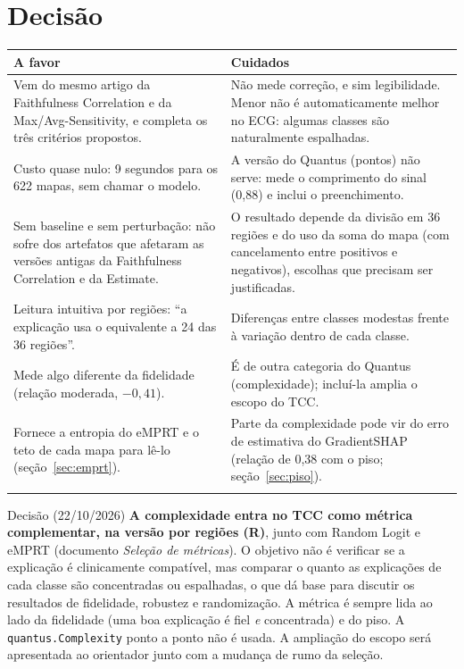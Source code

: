 \documentclass[11pt,a4paper]{article}
\begin{document}
\section{Decisão}\label{sec:decisao}
\begin{center}\small
\begin{tabularx}{\linewidth}{XX}
\toprule
\textbf{A favor} & \textbf{Cuidados} \\
\midrule
Vem do mesmo artigo da Faithfulness Correlation e da Max/Avg-Sensitivity, e completa os três critérios propostos. & Não mede correção, e sim legibilidade. Menor não é automaticamente melhor no ECG: algumas classes são naturalmente espalhadas. \\ \addlinespace
Custo quase nulo: 9 segundos para os 622 mapas, sem chamar o modelo. & A versão do Quantus (pontos) não serve: mede o comprimento do sinal (0,88) e inclui o preenchimento. \\ \addlinespace
Sem baseline e sem perturbação: não sofre dos artefatos que afetaram as versões antigas da Faithfulness Correlation e da Estimate. & O resultado depende da divisão em 36 regiões e do uso da soma do mapa (com cancelamento entre positivos e negativos), escolhas que precisam ser justificadas. \\ \addlinespace
Leitura intuitiva por regiões: “a explicação usa o equivalente a 24 das 36 regiões”. & Diferenças entre classes modestas frente à variação dentro de cada classe. \\ \addlinespace
Mede algo diferente da fidelidade (relação moderada, $-0{,}41$). & É de outra categoria do Quantus (complexidade); incluí-la amplia o escopo do TCC. \\ \addlinespace
Fornece a entropia do eMPRT e o teto de cada mapa para lê-lo (seção~\ref{sec:emprt}). & Parte da complexidade pode vir do erro de estimativa do GradientSHAP (relação de 0,38 com o piso; seção~\ref{sec:piso}). \\ \addlinespace
\bottomrule
\end{tabularx}
\end{center}

\begin{infobox}[ok]{Decisão (22/10/2026)}
\textbf{A complexidade entra no TCC como métrica complementar, na versão por regiões (R)}, junto com Random Logit e eMPRT (documento \textit{Seleção de métricas}). O objetivo não é verificar se a explicação é clinicamente compatível, mas comparar o quanto as explicações de cada classe são concentradas ou espalhadas, o que dá base para discutir os resultados de fidelidade, robustez e randomização. A métrica é sempre lida ao lado da fidelidade (uma boa explicação é fiel \textit{e} concentrada) e do piso. A \texttt{quantus.Complexity} ponto a ponto não é usada. A ampliação do escopo será apresentada ao orientador junto com a mudança de rumo da seleção.
\end{infobox}
\end{document}
